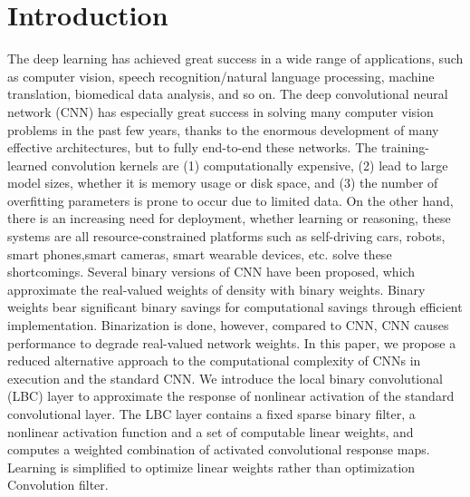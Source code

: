 \documentclass[10pt,twocolumn,letterpaper]{article}
\begin{document}
\section{Introduction}
The deep learning has achieved great success in a wide range of applications, such as computer vision, speech recognition/natural language processing, machine translation, biomedical data analysis, and so on. The deep convolutional neural network (CNN) has especially great success in solving many computer vision problems in the past few years, thanks to the enormous development of many effective architectures, but to fully end-to-end these networks. The training-learned convolution kernels are (1) computationally expensive, (2) lead to large model sizes, whether it is memory usage or disk space, and (3) the number of overfitting parameters is prone to occur due to limited data. On the other hand, there is an increasing need for deployment, whether learning or reasoning, these systems are all resource-constrained platforms such as self-driving cars, robots, smart phones,smart cameras, smart wearable devices, etc. solve these shortcomings. Several binary versions of CNN have been proposed, which approximate the real-valued weights of density with binary weights. Binary weights bear significant binary savings for computational savings through efficient implementation.\cite{Chen_2015_Compressing} Binarization is done, however, compared to CNN, CNN causes performance to degrade real-valued network weights. In this paper, we propose a reduced alternative approach to the computational complexity of CNNs in execution and the standard CNN. We introduce the local binary convolutional (LBC) layer to approximate the response of nonlinear activation of the standard convolutional layer. The LBC layer contains a fixed sparse binary filter, a nonlinear activation function and a set of computable linear weights, and computes a weighted combination of activated convolutional response maps. Learning is simplified to optimize linear weights rather than optimization
Convolution filter.
\end{document}
